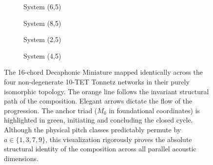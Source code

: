 \documentclass[11pt,letterpaper]{amsart}
\begin{document}
{
}

\begin{figure}[H]
    \centering
    \begin{subfigure}{0.48\textwidth}
        \centering
        \caption{System (6,5)}
    \end{subfigure}
    \hfill
    \begin{subfigure}{0.48\textwidth}
        \centering
        \caption{System (8,5)}
    \end{subfigure}
    
    \vspace{0.5cm}
    
    \begin{subfigure}{0.48\textwidth}
        \centering
        \caption{System (2,5)}
    \end{subfigure}
    \hfill
    \begin{subfigure}{0.48\textwidth}
        \centering
        \caption{System (4,5)}
    \end{subfigure}
    \caption{\small The 16-chord Decaphonic Miniature mapped identically across the four non-degenerate 10-TET Tonnetz networks in their purely isomorphic topology. The orange line follows the invariant structural path of the composition. Elegant arrows dictate the flow of the progression. The anchor triad ($M_0$ in foundational coordinates) is highlighted in green, initiating and concluding the closed cycle. Although the physical pitch classes predictably permute by $a \in \{1, 3, 7, 9\}$, this visualization rigorously proves the absolute structural identity of the composition across all parallel acoustic dimensions.}
    \label{fig:sonata_10tet_paths}
\end{figure}
\end{document}
